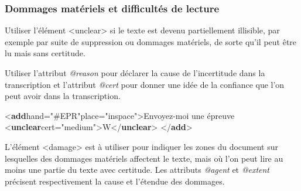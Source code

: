 \documentclass[]{beamer}\makeatletter
\begin{document}
\begin{frame}[fragile]
\frametitle{Dommages matériels et difficultés de lecture}\par
Utiliser l’élément {\color{blue2}<unclear>} si le texte est devenu      partiellement illisible, par exemple par suite de suppression ou      dommages matériels, de sorte qu’il peut être lu mais sans      certitude.\par
Utiliser l’attribut \emph{@reason} pour déclarer la cause de      l’incertitude dans la transcription et l’attribut \emph{@cert} pour      donner une idée de la confiance que l’on peut avoir dans la      transcription.\par
            
\bgroup\ttfamily\fontsize{8.5pt}{9pt}\selectfont\par
\begin{exampleblock}{}
\noindent\ttfamily\mbox{}{\color{blue1}<\textbf{add}\hspace*{6pt}hand="{\color{blue2}#EPR}"\hspace*{6pt}place="{\color{blue2}inspace}">}Envoyez-moi une épreuve {\color{blue1}<\textbf{unclear}\hspace*{6pt}cert="{\color{blue2}medium}">}W{\color{blue1}</\textbf{unclear}>}\mbox{}\newline 
{}\mbox{}\newline 
{\color{blue1}</\textbf{add}>}
\end{exampleblock}
\par\egroup
       \par
L’élément {\color{blue2}<damage>} est à utiliser pour indiquer les zones du      document sur lesquelles des dommages matériels affectent le texte,      mais où l’on peut lire au moins une partie du texte avec certitude.      Les attributs \emph{@agent} et \emph{@extent} précisent      respectivement la cause et l’étendue des dommages. 
\end{frame}
\end{document}
